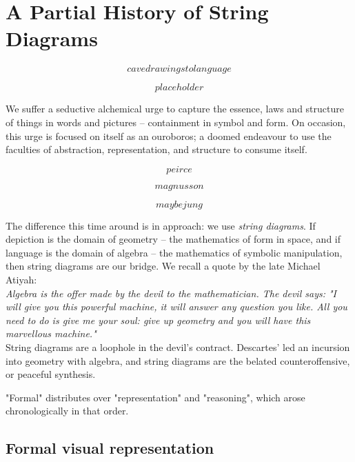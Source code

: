 \section{A Partial History of String Diagrams}


\[cavedrawings to language\]


\[placeholder\]

 We suffer a seductive alchemical urge to capture the essence, laws and structure of things in words and pictures -- containment in symbol and form. On occasion, this urge is focused on itself as an ouroboros; a doomed endeavour to use the faculties of abstraction, representation, and structure to consume itself.

\[peirce\]

\[magnusson\]

\[maybe jung\]

 The difference this time around is in approach: we use \emph{string diagrams}. If depiction is the domain of geometry -- the mathematics of form in space, and if language is the domain of algebra -- the mathematics of symbolic manipulation, then string diagrams are our bridge. We recall a quote by the late Michael Atiyah:\\

\emph{Algebra is the offer made by the devil to the mathematician. The devil says: "I will give you this powerful machine, it will answer any question you like. All you need to do is give me your soul: give up geometry and you will have this marvellous machine."}\\

String diagrams are a loophole in the devil's contract. Descartes' led an incursion into geometry with algebra, and string diagrams are the belated counteroffensive, or peaceful synthesis.

 "Formal" distributes over "representation" and "reasoning", which arose chronologically in that order.

\subsection{Formal visual representation}

